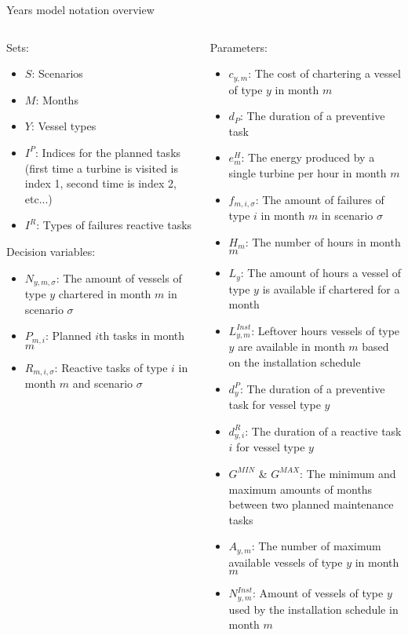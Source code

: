 \documentclass{beamer}
\begin{document}
\begin{frame}{Years model notation overview}
\tiny
\begin{columns}
\begin{column}{.48\textwidth}
Sets:
\begin{itemize}
\item $S$: Scenarios
\item $M$: Months
\item $Y$: Vessel types
\item $I^P$: Indices for the planned tasks (first time a turbine is visited is index 1, second time is index 2, etc...)
\item $I^R$: Types of failures reactive tasks
\end{itemize}

Decision variables:
\begin{itemize}
\item $N_{y,m,\sigma}$: The amount of vessels of type $y$ chartered in month $m$ in scenario $\sigma$
\item $P_{m,i}$: Planned $i$th tasks in month $m$
\item $R_{m,i,\sigma}$: Reactive tasks of type $i$ in month $m$ and scenario $\sigma$
\end{itemize}
\end{column}

\hfill

\begin{column}{.48\textwidth}
Parameters:
\begin{itemize}
\item $c_{y,m}$: The cost of chartering a vessel of type $y$ in month $m$
\item $d_P$: The duration of a preventive task
\item $e^H_m$: The energy produced by a single turbine per hour in month $m$
\item $f_{m,i,\sigma}$: The amount of failures of type $i$ in month $m$ in scenario $\sigma$
\item $H_m$: The number of hours in month $m$
\item $L_y$: The amount of hours a vessel of type $y$ is available if chartered for a month
\item $L^{Inst}_{y,m}$: Leftover hours vessels of type $y$ are available in month $m$ based on the installation schedule
\item $d^P_y$: The duration of a preventive task for vessel type $y$
\item $d^R_{y,i}$: The duration of a reactive task $i$ for vessel type $y$
\item $G^{MIN}$ \& $G^{MAX}$: The minimum and maximum amounts of months between two planned maintenance tasks
\item $A_{y,m}$: The number of maximum available vessels of type $y$ in month $m$
\item $N^{Inst}_{y,m}$: Amount of vessels of type $y$ used by the installation schedule in month $m$
\end{itemize}
\end{column}
\end{columns}
\end{frame}
\end{document}
